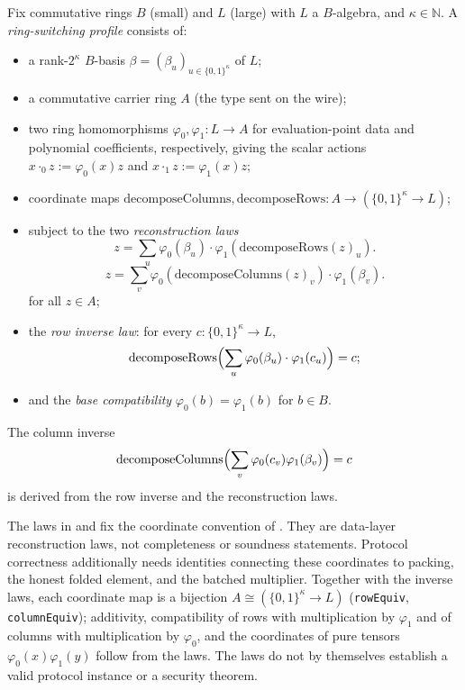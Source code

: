 \begin{definition}
  \leanok
  \label{def:ring_switching_profile}
  Fix commutative rings $B$ (small) and $L$ (large) with $L$ a $B$-algebra, and $\kappa \in
  \mathbb{N}$. A \emph{ring-switching profile} consists of:
  \begin{itemize}
    \item a rank-$2^\kappa$ $B$-basis $\beta = (\beta_u)_{u \in \{0,1\}^\kappa}$ of $L$;
    \item a commutative carrier ring $A$ (the type sent on the wire);
    \item two ring homomorphisms $\varphi_0, \varphi_1 : L \to A$ for evaluation-point data and
      polynomial coefficients, respectively, giving the scalar actions
      $x \cdot_0 z := \varphi_0(x)z$ and $x \cdot_1 z := \varphi_1(x)z$;
    \item coordinate maps $\mathrm{decomposeColumns}, \mathrm{decomposeRows} : A \to (\{0,1\}^\kappa
      \to L)$;
    \item subject to the two \emph{reconstruction laws}
      \begin{equation}
        z = \sum_{u} \varphi_0(\beta_u)\cdot \varphi_1(\mathrm{decomposeRows}(z)_u).
        \label{eq:rs-rows}
      \end{equation}
      \begin{equation}
        z = \sum_{v} \varphi_0(\mathrm{decomposeColumns}(z)_v)\cdot \varphi_1(\beta_v).
        \label{eq:rs-cols}
      \end{equation}
      for all $z \in A$;
    \item the \emph{row inverse law}: for every $c : \{0,1\}^\kappa \to L$,
      \[
        \mathrm{decomposeRows}\Bigl(\sum_{u} \varphi_0(\beta_u)\cdot \varphi_1(c_u)\Bigr) = c;
      \]
    \item and the \emph{base compatibility} $\varphi_0(b) = \varphi_1(b)$ for $b \in B$.
  \end{itemize}
\end{definition}

The column inverse
\[
  \mathrm{decomposeColumns}\Bigl(\sum_v \varphi_0(c_v)\varphi_1(\beta_v)\Bigr) = c
\]
is derived from the row inverse and the reconstruction laws.

The laws in  and  fix the coordinate convention of
\cite[\S2.5]{DP24}. They are data-layer reconstruction laws, not completeness or soundness
statements. Protocol correctness additionally needs identities connecting these coordinates to
packing, the honest folded element, and the batched multiplier. Together with the inverse laws,
each coordinate map is a bijection $A \cong (\{0,1\}^\kappa \to L)$ (\texttt{rowEquiv},
\texttt{columnEquiv}); additivity, compatibility of rows with multiplication by $\varphi_1$ and of
columns with multiplication by $\varphi_0$, and the coordinates of pure tensors
$\varphi_0(x)\varphi_1(y)$ follow from the laws.
The laws do not by themselves establish a valid protocol instance or a security theorem.

